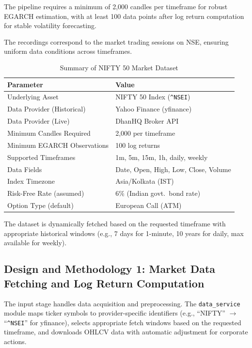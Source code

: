 \documentclass[12pt,a4paper]{article}
\begin{document}
The pipeline requires a minimum of 2,000 candles per timeframe for robust EGARCH estimation, with at least 100 data points after log return computation for stable volatility forecasting.

The recordings correspond to the market trading sessions on NSE, ensuring uniform data conditions across timeframes.

\begin{table}[H]
\centering
\caption{Summary of NIFTY 50 Market Dataset}
\label{tab:dataset}
\begin{tabular}{l l}
\toprule
\textbf{Parameter} & \textbf{Value} \\
\midrule
Underlying Asset & NIFTY 50 Index (\texttt{\^{}NSEI}) \\
Data Provider (Historical) & Yahoo Finance (yfinance) \\
Data Provider (Live) & DhanHQ Broker API \\
Minimum Candles Required & 2,000 per timeframe \\
Minimum EGARCH Observations & 100 log returns \\
Supported Timeframes & 1m, 5m, 15m, 1h, daily, weekly \\
Data Fields & Date, Open, High, Low, Close, Volume \\
Index Timezone & Asia/Kolkata (IST) \\
Risk-Free Rate (assumed) & 6\% (Indian govt.\ bond rate) \\
Option Type (default) & European Call (ATM) \\
\bottomrule
\end{tabular}
\end{table}

The dataset is dynamically fetched based on the requested timeframe with appropriate historical windows (e.g., 7 days for 1-minute, 10 years for daily, max available for weekly).

\subsection{Design and Methodology 1: Market Data Fetching and Log Return Computation}

The input stage handles data acquisition and preprocessing. The \texttt{data\_service} module maps ticker symbols to provider-specific identifiers (e.g., ``NIFTY'' $\rightarrow$ ``\texttt{\^{}NSEI}'' for yfinance), selects appropriate fetch windows based on the requested timeframe, and downloads OHLCV data with automatic adjustment for corporate actions.
\end{document}
